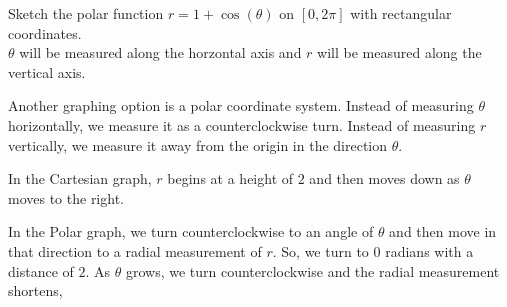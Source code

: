 \documentclass{ximera}
\begin{document}
\begin{example}
  Sketch the polar function $r=1+\cos(\theta)$ on $[0,2\pi]$ with rectangular coordinates.  \\


  $\theta$ will be measured along the horzontal axis and $r$ will be measured along the vertical axis.

    \begin{image}%
      \end{image}
\end{example}


Another graphing option is a polar coordinate system.  Instead of measuring $\theta$ horizontally, we measure it as a counterclockwise turn.  Instead of measuring $r$ vertically, we measure it away from the origin in the direction $\theta$.

In the Cartesian graph, $r$ begins at a height of $2$ and then moves down as $\theta$ moves to the right.

In the Polar graph, we turn counterclockwise to an angle of $\theta$ and then move in that direction to a radial measurement of $r$. So, we turn to $0$ radians with a distance of $2$.  As $\theta$ grows, we turn counterclockwise and the radial measurement shortens,

\begin{image}
\end{image}
\end{document}
